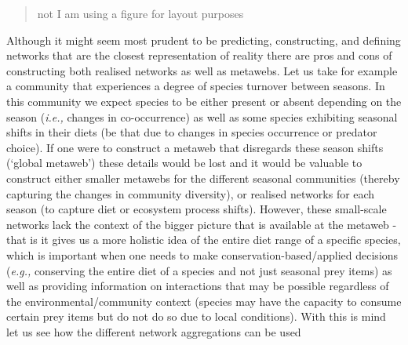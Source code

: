 \documentclass[
]{article}
\begin{document}
\begin{tcolorbox}[enhanced jigsaw, colbacktitle=quarto-callout-note-color!10!white, opacityback=0, colback=white, breakable, colframe=quarto-callout-note-color-frame, left=2mm, leftrule=.75mm, rightrule=.15mm, toprule=.15mm, bottomrule=.15mm, bottomtitle=1mm, toptitle=1mm, titlerule=0mm, title=\textcolor{quarto-callout-note-color}{\faInfo}\hspace{0.5em}{Box 1 - Why we need to aggregate networks at different scales: A
hypothetical case study}, arc=.35mm, coltitle=black, opacitybacktitle=0.6]

\begin{quote}
not I am using a figure for layout purposes
\end{quote}

Although it might seem most prudent to be predicting, constructing, and
defining networks that are the closest representation of reality there
are pros and cons of constructing both realised networks as well as
metawebs. Let us take for example a community that experiences a degree
of species turnover between seasons. In this community we expect species
to be either present or absent depending on the season (\emph{i.e.,}
changes in co-occurrence) as well as some species exhibiting seasonal
shifts in their diets (be that due to changes in species occurrence or
predator choice). If one were to construct a metaweb that disregards
these season shifts (`global metaweb') these details would be lost and
it would be valuable to construct either smaller metawebs for the
different seasonal communities (thereby capturing the changes in
community diversity), or realised networks for each season (to capture
diet or ecosystem process shifts). However, these small-scale networks
lack the context of the bigger picture that is available at the metaweb
- that is it gives us a more holistic idea of the entire diet range of a
specific species, which is important when one needs to make
conservation-based/applied decisions (\emph{e.g.,} conserving the entire
diet of a species and not just seasonal prey items) as well as providing
information on interactions that may be possible regardless of the
environmental/community context (species may have the capacity to
consume certain prey items but do not do so due to local conditions).
With this is mind let us see how the different network aggregations can
be used

\begin{figure}[H]

\centering{

}
\end{figure}
\end{tcolorbox}
\end{document}
